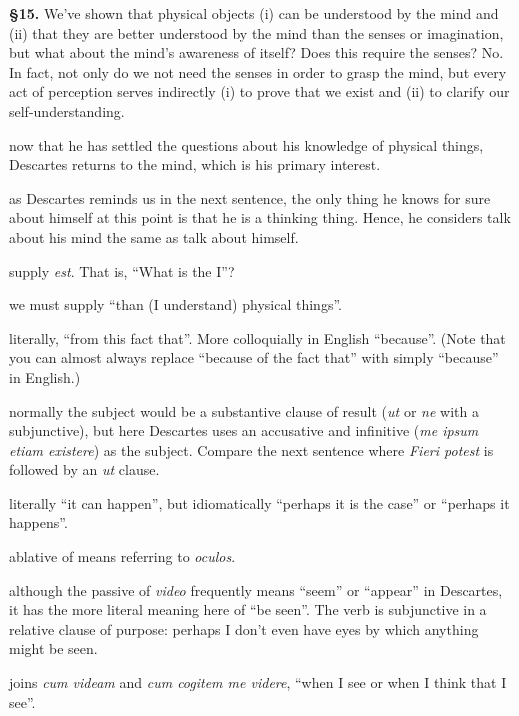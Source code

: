 \prenotes

\textbf{§15.} We've shown that physical objects (i) can be understood by the mind and (ii) that they are better understood by the mind than the senses or imagination, but what about the mind's awareness of itself? Does this require the senses? No. In fact, not only do we not need the senses in order to grasp the mind, but every act of perception serves indirectly (i) to prove that we exist and (ii) to clarify our self-understanding.

 now that he has settled the questions about his knowledge of physical things, Descartes returns to the mind, which is his primary interest.

 as Descartes reminds us in the next sentence, the only thing he knows for sure about himself at this point is that he is a thinking thing. Hence, he considers talk about his mind the same as talk about himself.

 supply \textit{est}. That is, ``What is the I''?

 we must supply ``than (I understand) physical things''.

 literally, ``from this fact that''. More colloquially in English ``because''. (Note that you can almost always replace ``because of the fact that'' with simply ``because'' in English.)

 normally the subject would be a substantive clause of result (\textit{ut} or \textit{ne} with a subjunctive), but here Descartes uses an accusative and infinitive (\textit{me ipsum etiam existere}) as the subject. Compare the next sentence where \textit{Fieri potest} is followed by an \textit{ut} clause.

 literally ``it can happen'', but idiomatically ``perhaps it is the case'' or ``perhaps it happens''.

 ablative of means referring to \textit{oculos}.

 although the passive of \textit{video} frequently means ``seem'' or ``appear'' in Descartes, it has the more literal meaning here of ``be seen''. The verb is subjunctive in a relative clause of purpose: perhaps I don't even have eyes by which anything might be seen.

 joins \textit{cum videam} and \textit{cum cogitem me videre}, ``when I see or when I think that I see''.

